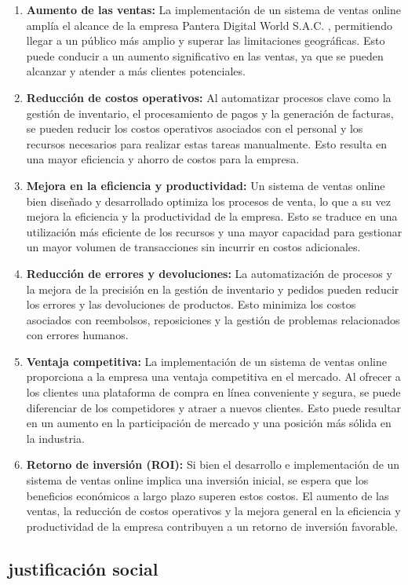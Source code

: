 \documentclass[12pt,a4paper]{article}
\newcommand{\newsubsection}[1]{\subsection{\hspace{4mm} #1}}
\newcommand{\empresa}{Pantera Digital World S.A.C. }
\begin{document}
\begin{enumerate}
\item \textbf{Aumento de las ventas:} La implementación de un sistema de ventas online amplía el alcance de la empresa \empresa, permitiendo llegar a un público más amplio y superar las limitaciones geográficas. Esto puede conducir a un aumento significativo en las ventas, ya que se pueden alcanzar y atender a más clientes potenciales.
\item \textbf{Reducción de costos operativos:} Al automatizar procesos clave como la gestión de inventario, el procesamiento de pagos y la generación de facturas, se pueden reducir los costos operativos asociados con el personal y los recursos necesarios para realizar estas tareas manualmente. Esto resulta en una mayor eficiencia y ahorro de costos para la empresa.
\item \textbf{Mejora en la eficiencia y productividad:} Un sistema de ventas online bien diseñado y desarrollado optimiza los procesos de venta, lo que a su vez mejora la eficiencia y la productividad de la empresa. Esto se traduce en una utilización más eficiente de los recursos y una mayor capacidad para gestionar un mayor volumen de transacciones sin incurrir en costos adicionales.
\item \textbf{Reducción de errores y devoluciones:} La automatización de procesos y la mejora de la precisión en la gestión de inventario y pedidos pueden reducir los errores y las devoluciones de productos. Esto minimiza los costos asociados con reembolsos, reposiciones y la gestión de problemas relacionados con errores humanos.
\item \textbf{Ventaja competitiva:} La implementación de un sistema de ventas online proporciona a la empresa una ventaja competitiva en el mercado. Al ofrecer a los clientes una plataforma de compra en línea conveniente y segura, se puede diferenciar de los competidores y atraer a nuevos clientes. Esto puede resultar en un aumento en la participación de mercado y una posición más sólida en la industria.
\item \textbf{Retorno de inversión (ROI):} Si bien el desarrollo e implementación de un sistema de ventas online implica una inversión inicial, se espera que los beneficios económicos a largo plazo superen estos costos. El aumento de las ventas, la reducción de costos operativos y la mejora general en la eficiencia y productividad de la empresa contribuyen a un retorno de inversión favorable.
\end{enumerate}
\newsubsection{justificación social}
\end{document}
